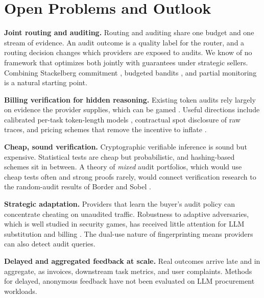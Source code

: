 \documentclass[sigconf]{acmart}
\begin{document}
\section{Open Problems and Outlook}\label{open-problems-and-outlook}

\textbf{Joint routing and auditing.} Routing and auditing share one budget and one stream of evidence. An audit outcome is a quality label for the router, and a routing decision changes which providers are exposed to audits. We know of no framework that optimizes both jointly with guarantees under strategic sellers. Combining Stackelberg commitment \cite{conitzer2006commit}, budgeted bandits \cite{badanidiyuru2018bwk}, and partial monitoring \cite{bartok2014partial} is a natural starting point.

\textbf{Billing verification for hidden reasoning.} Existing token audits \cite{sun2025coin, wang2025palace} rely largely on evidence the provider supplies, which can be gamed \cite{hoque2026tokeninflation}. Useful directions include calibrated per-task token-length models \cite{han2024tokenbudget}, contractual spot disclosure of raw traces, and pricing schemes that remove the incentive to inflate \cite{velasco2025overcharging}.

\textbf{Cheap, sound verification.} Cryptographic verifiable inference \cite{sun2024zkllm, chen2024zkml} is sound but expensive. Statistical tests \cite{gao2025equality} are cheap but probabilistic, and hashing-based schemes \cite{ong2025toploc} sit in between. A theory of \emph{mixed} audit portfolios, which would use cheap tests often and strong proofs rarely, would connect verification research to the random-audit results of Border and Sobel \cite{border1987samurai}.

\textbf{Strategic adaptation.} Providers that learn the buyer's audit policy can concentrate cheating on unaudited traffic. Robustness to adaptive adversaries, which is well studied in security games, has received little attention for LLM substitution and billing \cite{cai2025substitution, hoque2026tokeninflation}. The dual-use nature of fingerprinting \cite{pasquini2025llmmap} means providers can also detect audit queries.

\textbf{Delayed and aggregated feedback at scale.} Real outcomes arrive late and in aggregate, as invoices, downstream task metrics, and user complaints. Methods for delayed, anonymous feedback \cite{pikeburke2018aggregated, vernade2017delayed} have not been evaluated on LLM procurement workloads.
\end{document}
